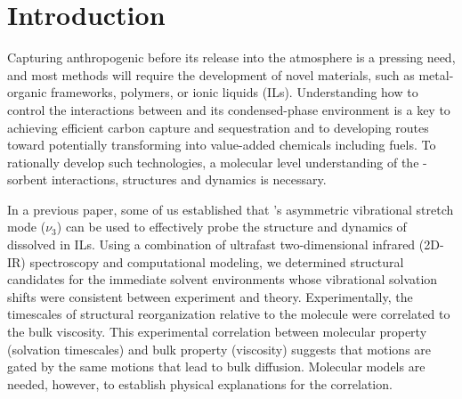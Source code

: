 \section{Introduction}
\label{paper_02:sec:I}

Capturing anthropogenic  before its release into the atmosphere is a pressing need, and most methods will require the development of novel materials, such as metal-organic frameworks, polymers, or ionic liquids (ILs).\cite{sumidaCR-12,Du2011,Dawson2011,baraACR-10,seoJPCB-14,DAlessandro2010} Understanding how to control the interactions between  and its condensed-phase environment is a key to achieving efficient carbon capture and sequestration\cite{Corvo2015,Hayes2015,seoJPCB-14,gurkanJPCL-10} and to developing routes toward potentially transforming  into value-added chemicals including fuels.\cite{Grice2015,Rosen2011,Kumar2012} To rationally develop such technologies, a molecular level understanding of the -sorbent interactions, structures and dynamics is necessary.

In a previous paper\cite{Brinzer2015}, some of us established that 's asymmetric vibrational stretch mode (\(\nu_{3}\)) can be used to effectively probe the structure and dynamics of  dissolved in ILs. Using a combination of ultrafast two-dimensional infrared (2D-IR) spectroscopy and computational modeling, we determined structural candidates for the immediate  solvent environments whose vibrational solvation shifts were consistent between experiment and theory. Experimentally, the timescales of structural reorganization relative to the  molecule were correlated to the bulk viscosity. This experimental correlation between molecular property (solvation timescales) and bulk property (viscosity) suggests that  motions are gated by the same motions that lead to bulk diffusion. Molecular models are needed, however, to establish physical explanations for the correlation.

